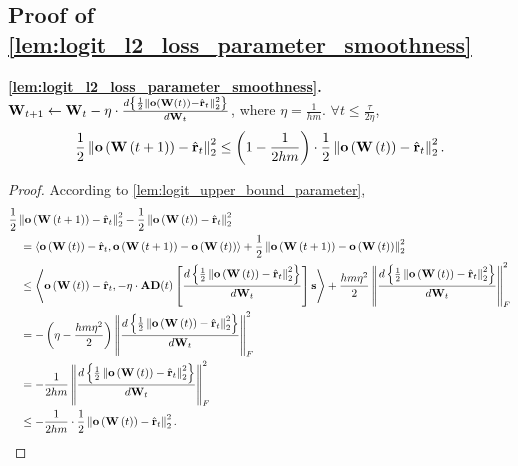 \subsection{Proof of \cref{lem:logit_l2_loss_parameter_smoothness}}

{\bf \cref{lem:logit_l2_loss_parameter_smoothness}.} ${\mathbf{W}}_{t+1} \leftarrow {\mathbf{W}}_t - \eta \cdot \frac{d \left\{ \frac{1}{2} \left\| {\mathbf{o}}\left( {\mathbf{W}}\left(t\right)\right) - \hat{{\mathbf{r}}}_t \right\|_2^2 \right\}}{d {\mathbf{W}}_t}$, where $\eta = \frac{1}{h m}$. $\forall t \le \frac{\tau}{2 \eta}$,
\begin{equation*}
\begin{split}
    \frac{1}{2} \left\| {\mathbf{o}}\left( {\mathbf{W}}\left(t+1\right) \right) - \hat{{\mathbf{r}}}_t \right\|_2^2 \le \left( 1 - \frac{1}{2 h m} \right) \cdot \frac{1}{2} \left\| {\mathbf{o}}\left( {\mathbf{W}}\left(t\right) \right) - \hat{{\mathbf{r}}}_t \right\|_2^2.
\end{split}
\end{equation*}
\begin{proof}
According to \cref{lem:logit_upper_bound_parameter},
\begin{equation*}
\begin{split}
    &\frac{1}{2} \left\| {\mathbf{o}}\left( {\mathbf{W}}\left(t+1\right) \right) - \hat{{\mathbf{r}}}_t \right\|_2^2 - \frac{1}{2} \left\| {\mathbf{o}}\left( {\mathbf{W}}\left(t\right) \right) - \hat{{\mathbf{r}}}_t \right\|_2^2 \\
    &\quad = \left\langle {\mathbf{o}}\left( {\mathbf{W}}\left(t\right) \right) - \hat{{\mathbf{r}}}_t, {\mathbf{o}}\left( {\mathbf{W}}\left(t+1\right) \right) - {\mathbf{o}}\left( {\mathbf{W}}\left(t\right) \right) \right\rangle + \frac{1}{2} \left\| {\mathbf{o}}\left( {\mathbf{W}}\left(t+1\right) \right) - {\mathbf{o}}\left( {\mathbf{W}}\left(t\right) \right) \right\|_2^2 \\
    &\quad \le \left\langle {\mathbf{o}}\left( {\mathbf{W}}\left(t\right) \right) - \hat{{\mathbf{r}}}_t, - \eta \cdot {\mathbf{A}} {\mathbf{D}}(t) \left[ \frac{d \left\{ \frac{1}{2} \left\| {\mathbf{o}}\left( {\mathbf{W}}\left(t\right)\right) - \hat{{\mathbf{r}}}_t \right\|_2^2 \right\}}{d {\mathbf{W}}_t} \right] {\mathbf{s}} \right\rangle + \frac{h m \eta^2}{2} \left\| \frac{d \left\{ \frac{1}{2} \left\| {\mathbf{o}}\left( {\mathbf{W}}\left(t\right)\right) - \hat{{\mathbf{r}}}_t \right\|_2^2 \right\}}{d {\mathbf{W}}_t}  \right\|_F^2 \\
    &\quad = - \left( \eta - \frac{h m \eta^2}{2} \right) \left\| \frac{d \left\{ \frac{1}{2} \left\| {\mathbf{o}}\left( {\mathbf{W}}\left(t\right)\right) - \hat{{\mathbf{r}}}_t \right\|_2^2 \right\}}{d {\mathbf{W}}_t}  \right\|_F^2 \\
    &\quad = - \frac{1}{2 h m} \left\| \frac{d \left\{ \frac{1}{2} \left\| {\mathbf{o}}\left( {\mathbf{W}}\left(t\right)\right) - \hat{{\mathbf{r}}}_t \right\|_2^2 \right\}}{d {\mathbf{W}}_t}  \right\|_F^2 \\
    &\quad \le - \frac{1}{2 h m} \cdot \frac{1}{2} \left\| {\mathbf{o}}\left( {\mathbf{W}}\left(t\right)\right) - \hat{{\mathbf{r}}}_t \right\|_2^2. \qedhere
\end{split}
\end{equation*}
\end{proof}

